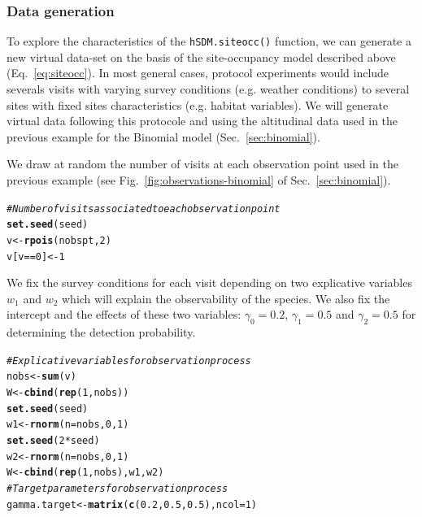 \documentclass[a4paper, 12pt, leqno]{article}\usepackage[]{graphicx}\usepackage[]{color}
\makeatletter
\newcommand{\hlnum}[1]{\textcolor[rgb]{0.686,0.059,0.569}{#1}}%
\newcommand{\hlcom}[1]{\textcolor[rgb]{0.678,0.584,0.686}{\textit{#1}}}%
\newcommand{\hlopt}[1]{\textcolor[rgb]{0,0,0}{#1}}%
\newcommand{\hlstd}[1]{\textcolor[rgb]{0.345,0.345,0.345}{#1}}%
\newcommand{\hlkwb}[1]{\textcolor[rgb]{0.69,0.353,0.396}{#1}}%
\newcommand{\hlkwc}[1]{\textcolor[rgb]{0.333,0.667,0.333}{#1}}%
\newcommand{\hlkwd}[1]{\textcolor[rgb]{0.737,0.353,0.396}{\textbf{#1}}}%
\newenvironment{kframe}{%
 \def\at@end@of@kframe{}%
 \ifinner\ifhmode%
  \def\at@end@of@kframe{\end{minipage}}%
  \begin{minipage}{\columnwidth}%
 \fi\fi%
 \def\FrameCommand##1{\hskip\@totalleftmargin \hskip-\fboxsep
 \colorbox{shadecolor}{##1}\hskip-\fboxsep
     \hskip-\linewidth \hskip-\@totalleftmargin \hskip\columnwidth}%
 \MakeFramed {\advance\hsize-\width
   \@totalleftmargin\z@ \linewidth\hsize
   \@setminipage}}%
 {\par\unskip\endMakeFramed%
 \at@end@of@kframe}
\newenvironment{knitrout}{}{} %
\makeatother
\begin{document}
\subsubsection{Data generation}

To explore the characteristics of the \texttt{hSDM.siteocc()} function, we can generate a
new virtual data-set on the basis of the site-occupancy model described above
(Eq.~\ref{eq:siteocc}). In most general cases, protocol experiments would include severals
visits with varying survey conditions (e.g. weather conditions) to several sites with
fixed sites characteristics (e.g. habitat variables). We will generate virtual data
following this protocole and using the altitudinal data used in the previous example for
the Binomial model (Sec.~\ref{sec:binomial}).

We draw at random the number of visits at each observation point used in the previous
example (see Fig.~\ref{fig:observations-binomial} of Sec.~\ref{sec:binomial}).

\begin{knitrout}\small
{}\color{fgcolor}\begin{kframe}
\begin{alltt}
\hlcom{# Number of visits associated to each observation point}
\hlkwd{set.seed}\hlstd{(seed)}
\hlstd{v} \hlkwb{<-} \hlkwd{rpois}\hlstd{(nobspt,}\hlnum{2}\hlstd{)}
\hlstd{v[v}\hlopt{==}\hlnum{0}\hlstd{]} \hlkwb{<-} \hlnum{1}
\end{alltt}
\end{kframe}
\end{knitrout}


We fix the survey conditions for each visit depending on two explicative variables $w_1$
and $w_2$ which will explain the observability of the species. We also fix the intercept
and the effects of these two variables: $\gamma_0=0.2$, $\gamma_1=0.5$ and $\gamma_2=0.5$
for determining the detection probability.

\begin{knitrout}\small
{}\color{fgcolor}\begin{kframe}
\begin{alltt}
\hlcom{# Explicative variables for observation process}
\hlstd{nobs} \hlkwb{<-} \hlkwd{sum}\hlstd{(v)}
\hlstd{W} \hlkwb{<-} \hlkwd{cbind}\hlstd{(}\hlkwd{rep}\hlstd{(}\hlnum{1}\hlstd{,nobs))}
\hlkwd{set.seed}\hlstd{(seed)}
\hlstd{w1} \hlkwb{<-} \hlkwd{rnorm}\hlstd{(}\hlkwc{n}\hlstd{=nobs,}\hlnum{0}\hlstd{,}\hlnum{1}\hlstd{)}
\hlkwd{set.seed}\hlstd{(}\hlnum{2}\hlopt{*}\hlstd{seed)}
\hlstd{w2} \hlkwb{<-} \hlkwd{rnorm}\hlstd{(}\hlkwc{n}\hlstd{=nobs,}\hlnum{0}\hlstd{,}\hlnum{1}\hlstd{)}
\hlstd{W} \hlkwb{<-} \hlkwd{cbind}\hlstd{(}\hlkwd{rep}\hlstd{(}\hlnum{1}\hlstd{,nobs),w1,w2)}
\hlcom{# Target parameters for observation process}
\hlstd{gamma.target} \hlkwb{<-} \hlkwd{matrix}\hlstd{(}\hlkwd{c}\hlstd{(}\hlnum{0.2}\hlstd{,}\hlnum{0.5}\hlstd{,}\hlnum{0.5}\hlstd{),}\hlkwc{ncol}\hlstd{=}\hlnum{1}\hlstd{)}
\end{alltt}
\end{kframe}
\end{knitrout}
\end{document}
